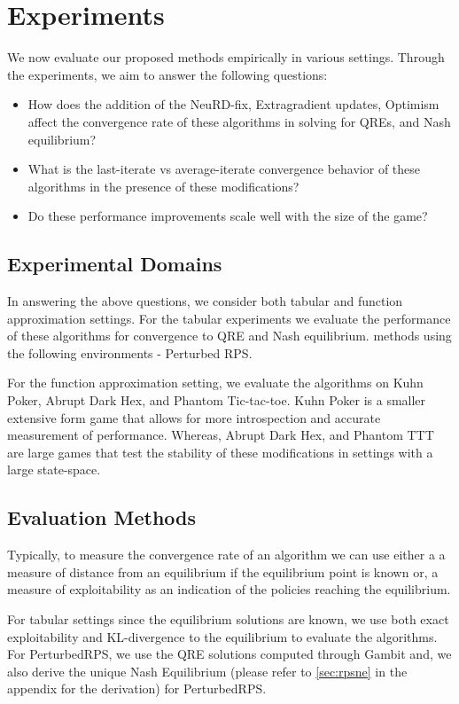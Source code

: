 \chapter{Experiments}

We now evaluate our proposed methods empirically in various settings.
Through the experiments, we aim to answer the following questions:

\begin{itemize}
	\item How does the addition of the NeuRD-fix, Extragradient updates, Optimism
	      affect the convergence rate of these algorithms in solving for QREs, and Nash equilibrium?
	\item What is the last-iterate vs average-iterate convergence behavior of these algorithms in the presence of these modifications?
	\item Do these performance improvements scale well with the size of the game?
\end{itemize}

\section{Experimental Domains}
In answering the above questions, we consider both tabular and function approximation settings.
For the tabular experiments we evaluate the performance of these algorithms for convergence to QRE
and Nash equilibrium.
methods using the following environments - Perturbed
RPS.

For the function approximation setting, we evaluate the algorithms on Kuhn Poker, Abrupt Dark Hex,
and Phantom Tic-tac-toe.
Kuhn Poker is a smaller extensive form game that allows for more introspection and accurate
measurement of performance.
Whereas, Abrupt Dark Hex, and Phantom TTT are large games that test the stability of these
modifications in settings with a large state-space.

\section{Evaluation Methods}

Typically, to measure the convergence rate of an algorithm we can use either a a measure of
distance from an equilibrium if the equilibrium point is known or, a measure of exploitability as
an indication of the policies reaching the equilibrium.

For tabular settings since the equilibrium solutions are known, we use both exact exploitability
and KL-divergence to the equilibrium to evaluate the algorithms.
For PerturbedRPS, we use the QRE solutions computed through Gambit and, we also derive the unique
Nash Equilibrium (please refer to \ref{sec:rpsne} in the appendix for the derivation) for
PerturbedRPS.


